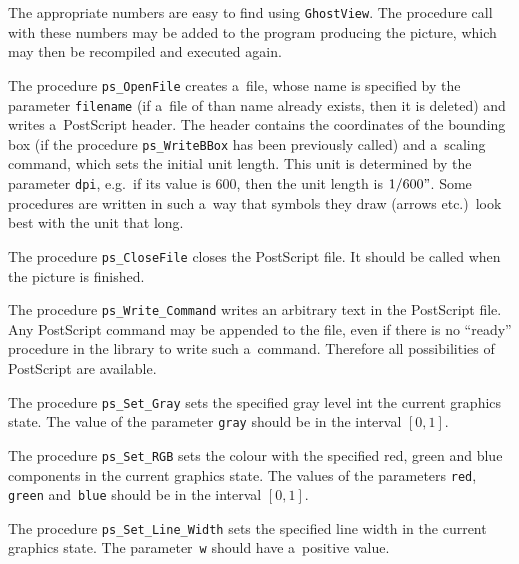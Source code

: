 The appropriate numbers are easy to find using \texttt{GhostView}. The procedure
call with these numbers may be added to the program producing the picture,
which may then be recompiled and executed again.

\vspace{\bigskipamount}
The procedure \texttt{ps\_OpenFile} creates a~file, whose name is specified
by the parameter \texttt{filename} (if a~file of than name already exists,
then it is deleted) and writes a~PostScript header.
The header contains the coordinates of the bounding box
(if the procedure \texttt{ps\_WriteBBox} has been previously called)
and a~scaling command, which sets the initial unit length. This unit is determined
by the parameter \texttt{dpi}, e.g.\ if its value is $600$, then
the unit length is $1/600"$. Some procedures are written in such a~way that
symbols they draw (arrows etc.)\ look best with the unit that long.

The procedure \texttt{ps\_CloseFile} closes the PostScript file. It should
be called when the picture is finished.

\vspace{\bigskipamount}
The procedure \texttt{ps\_Write\_Command} writes an arbitrary text in the
PostScript file. Any PostScript command may be appended to the file,
even if there is no ``ready'' procedure in the library to write such a~command.
Therefore all possibilities of PostScript are available.

\vspace{\bigskipamount}
The procedure \texttt{ps\_Set\_Gray} sets the specified gray level
int the current graphics state. The value of the parameter \texttt{gray}
should be in the interval $[0,1]$.

\vspace{\bigskipamount}
The procedure \texttt{ps\_Set\_RGB} sets the colour with the specified
red, green and blue components in the current graphics state.
The values of the parameters \texttt{red}, \texttt{green} and~\texttt{blue}
should be in the interval $[0,1]$.

\vspace{\bigskipamount}
The procedure \texttt{ps\_Set\_Line\_Width} sets the specified line width
in the current graphics state. The parameter~\texttt{w} should have
a~positive value.

